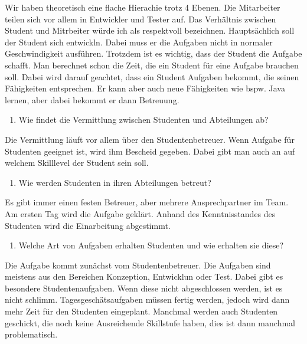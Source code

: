 \documentclass[
  12pt,
  ngerman,
  a4paper,
]{article}
\providecommand{\tightlist}{%
  \setlength{\itemsep}{0pt}\setlength{\parskip}{0pt}}
\begin{document}
Wir haben theoretisch eine flache Hierachie trotz 4 Ebenen. Die
Mitarbeiter teilen sich vor allem in Entwickler und Tester auf. Das
Verhältnis zwischen Student und Mitrbeiter würde ich als respektvoll
bezeichnen. Hauptsächlich soll der Student sich entwickln. Dabei muss er
die Aufgaben nicht in normaler Geschwindigkeit ausführen. Trotzdem ist
es wichtig, dass der Student die Aufgabe schafft. Man berechnet schon
die Zeit, die ein Student für eine Aufgabe brauchen soll. Dabei wird
darauf geachtet, dass ein Student Aufgaben bekommt, die seinen
Fähigkeiten entsprechen. Er kann aber auch neue Fähigkeiten wie bspw.
Java lernen, aber dabei bekommt er dann Betreuung.

\begin{enumerate}
\def\labelenumi{\arabic{enumi}.}
\setcounter{enumi}{4}
\tightlist
\item
  Wie findet die Vermittlung zwischen Studenten und Abteilungen ab?
\end{enumerate}

Die Vermittlung läuft vor allem über den Studentenbetreuer. Wenn Aufgabe
für Studenten geeignet ist, wird ihm Bescheid gegeben. Dabei gibt man
auch an auf welchem Skilllevel der Student sein soll.

\begin{enumerate}
\def\labelenumi{\arabic{enumi}.}
\setcounter{enumi}{5}
\tightlist
\item
  Wie werden Studenten in ihren Abteilungen betreut?
\end{enumerate}

Es gibt immer einen festen Betreuer, aber mehrere Ansprechpartner im
Team. Am ersten Tag wird die Aufgabe geklärt. Anhand des Kenntnisstandes
des Studenten wird die Einarbeitung abgestimmt.

\begin{enumerate}
\def\labelenumi{\arabic{enumi}.}
\setcounter{enumi}{6}
\tightlist
\item
  Welche Art von Aufgaben erhalten Studenten und wie erhalten sie diese?
\end{enumerate}

Die Aufgabe kommt zunächst vom Studentenbetreuer. Die Aufgaben sind
meistens aus den Bereichen Konzeption, Entwicklun oder Test. Dabei gibt
es besondere Studentenaufgaben. Wenn diese nicht abgeschlossen werden,
ist es nicht schlimm. Tagesgeschätsaufgaben müssen fertig werden, jedoch
wird dann mehr Zeit für den Studenten eingeplant. Manchmal werden auch
Studenten geschickt, die noch keine Ausreichende Skillstufe haben, dies
ist dann manchmal problematisch.
\end{document}
